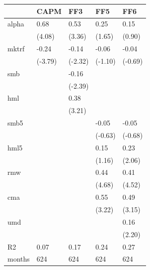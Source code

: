 \begin{tabular}{lllll}
\toprule
 & CAPM & FF3 & FF5 & FF6 \\
\midrule
alpha & 0.68 & 0.53 & 0.25 & 0.15 \\
 & (4.08) & (3.36) & (1.65) & (0.90) \\
mktrf & -0.24 & -0.14 & -0.06 & -0.04 \\
 & (-3.79) & (-2.32) & (-1.10) & (-0.69) \\
smb &  & -0.16 &  &  \\
 &  & (-2.39) &  &  \\
hml &  & 0.38 &  &  \\
 &  & (3.21) &  &  \\
smb5 &  &  & -0.05 & -0.05 \\
 &  &  & (-0.63) & (-0.68) \\
hml5 &  &  & 0.15 & 0.23 \\
 &  &  & (1.16) & (2.06) \\
rmw &  &  & 0.44 & 0.41 \\
 &  &  & (4.68) & (4.52) \\
cma &  &  & 0.55 & 0.49 \\
 &  &  & (3.22) & (3.15) \\
umd &  &  &  & 0.16 \\
 &  &  &  & (2.20) \\
R2 & 0.07 & 0.17 & 0.24 & 0.27 \\
months & 624 & 624 & 624 & 624 \\
\bottomrule
\end{tabular}
